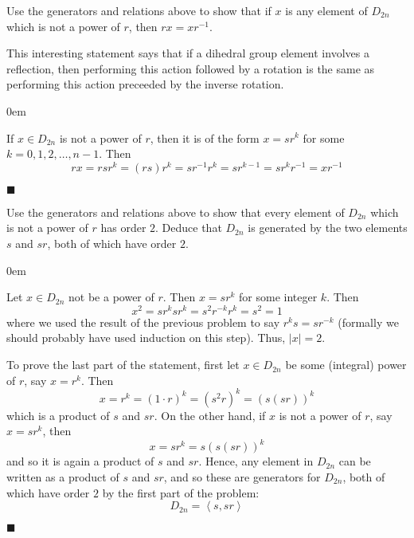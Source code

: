 \documentclass[12pt]{article}
\renewcommand{\qed}{\hfill$\blacksquare$}
\renewenvironment{proof}{\begin{addmargin}[1em]{0em}\begin{newproof}}{\end{newproof}\end{addmargin}\qed}
\newenvironment{problem}[2][Exercise]{\begin{trivlist}
\item[\hskip \labelsep {\bfseries #1}\hskip \labelsep {\bfseries #2.}]}{\end{trivlist}}
\begin{document}
\begin{problem}{1.2.2}
Use the generators and relations above to show that if $x$ is any element of $D_{2n}$ which is not a power of $r$, then $rx=xr^{-1}$.
\end{problem}
This interesting statement says that if a dihedral group element involves a reflection, then performing this action followed by a rotation is the same as performing this action preceeded by the inverse rotation.
\begin{proof}
If $x\in D_{2n}$ is not a power of $r$, then it is of the form $x=sr^k$ for some $k=0,1,2,\ldots,n-1$. Then $$ rx = rsr^k = \left(rs\right)r^k = sr^{-1}r^k = sr^{k-1}=sr^{k}r^{-1}=xr^{-1} $$
\end{proof}

\begin{problem}{1.2.3}
Use the generators and relations above to show that every element of $D_{2n}$ which is not a power of $r$ has order $2$. Deduce that $D_{2n}$ is generated by the two elements $s$ and $sr$, both of which have order $2$.
\end{problem}
\begin{proof}
Let $x \in D_{2n}$ not be a power of $r$. Then $x=sr^k$ for some integer $k$. Then
$$ x^2 = sr^ksr^k = s^2 r^{-k}r^k = s^2 = 1 $$
where we used the result of the previous problem to say $r^ks=sr^{-k}$ (formally we should probably have used induction on this step). Thus, $\left|x\right|=2$.

To prove the last part of the statement, first let $x\in D_{2n}$ be some (integral) power of $r$, say $x=r^k$. Then
$$ x = r^k = \left(1\cdot r\right)^k = \left(s^2r\right)^k = \left(s\left(sr\right)\right)^k $$ which is a product of $s$ and $sr$. On the other hand, if $x$ is not a power of $r$, say $x=sr^k$, then
$$ x = sr^k = s\left(s\left(sr\right)\right)^k $$ and so it is again a product of $s$ and $sr$. Hence, any element in $D_{2n}$ can be written as a product of $s$ and $sr$, and so these are generators for $D_{2n}$, both of which have order $2$ by the first part of the problem:
$$ D_{2n}=\left\langle s,sr\right\rangle $$
\end{proof}
\end{document}
